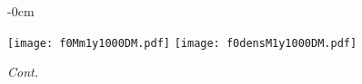 \documentclass[universe,article,accept,moreauthors,pdftex]{Definitions/mdpi}
\begin{document}
\begin{figure}[H]

\begin{adjustwidth}{-\extralength}{0cm}
\centering %

{\texttt{[image: f0Mm1y1000DM.pdf]}\vspace{3pt}
	  \texttt{[image: f0densM1y1000DM.pdf]}}\\
\end{adjustwidth}
\caption{\emph{Cont.}}
\label{fig:f0Mdens1000DM}

\end{figure}
\end{document}
